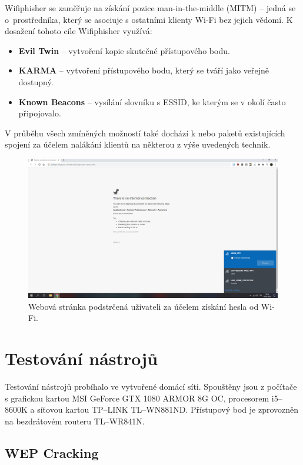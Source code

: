 Wifiphisher se zaměřuje na získání pozice man-in-the-middle (MITM) -- jedná se o~prostředníka, který se asociuje s ostatními klienty Wi-Fi bez jejich vědomí. K dosažení tohoto cíle Wifiphisher využívá:
\begin{itemize}
  \item{\textbf{Evil Twin} -- vytvoření kopie skutečné přístupového bodu.}
  \item{\textbf{KARMA} -- vytvoření přístupového bodu, který se tváří jako veřejně dostupný.}
  \item{\textbf{Known Beacons} -- vysílání slovníku s ESSID, ke kterým se v okolí často připojovalo.}
\end{itemize}
V průběhu všech zmíněných možností také dochází k  nebo  paketů existujících spojení za účelem nalákání klientů na některou z výše uvedených technik.

\begin{figure}[htbp]
  \centering
  \includegraphics[width=14.7cm]{obrazky-figures/phishing.png}
  \caption{Webová stránka podstrčená uživateli za účelem získání hesla od Wi-Fi.}
  \label{img:web}
\end{figure}

\section{Testování nástrojů}
Testování nástrojů probíhalo ve vytvořené domácí síti. Spouštěny jsou z počítače s grafickou kartou MSI GeForce GTX 1080 ARMOR 8G OC, procesorem i5--8600K a síťovou kartou TP--LINK TL--WN881ND. Přístupový bod je zprovozněn na bezdrátovém routeru TL--WR841N.

\subsection{WEP Cracking}
